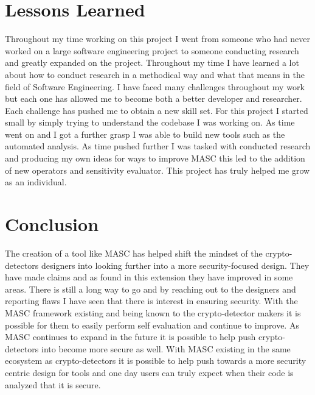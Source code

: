 \section{Lessons Learned}
\label{ch6:sec:lessons}

Throughout my time working on this project I went from someone who had never worked on a large software engineering project to someone conducting research and greatly expanded on the project. Throughout my time I have learned a lot about how to conduct research in a methodical way and what that means in the field of Software Engineering. I have faced many challenges throughout my work but each one has allowed me to become both a better developer and researcher. Each challenge has pushed me to obtain a new skill set. For this project I started small by simply trying to understand the codebase I was working on. As time went on and I got a further grasp I was able to build new tools such as the automated analysis. As time pushed further I was tasked with conducted research and producing my own ideas for ways to improve MASC this led to the addition of new operators and sensitivity evaluator. This project has truly helped me grow as an individual.

\section{Conclusion}
\label{ch6:sec:conclusion}

The creation of a tool like MASC has helped shift the mindset of the crypto-detectors designers into looking further into a more security-focused design. They have made claims and as found in this extension they have improved in some areas. There is still a long way to go and by reaching out to the designers and reporting flaws I have seen that there is interest in ensuring security. With the MASC framework existing and being known to the crypto-detector makers it is possible for them to easily perform self evaluation and continue to improve. As MASC continues to expand in the future it is possible to help push crypto-detectors into become more secure as well. With MASC existing in the same ecosystem as crypto-detectors it is possible to help push towards a more security centric design for tools and one day users can truly expect when their code is analyzed that it is secure.